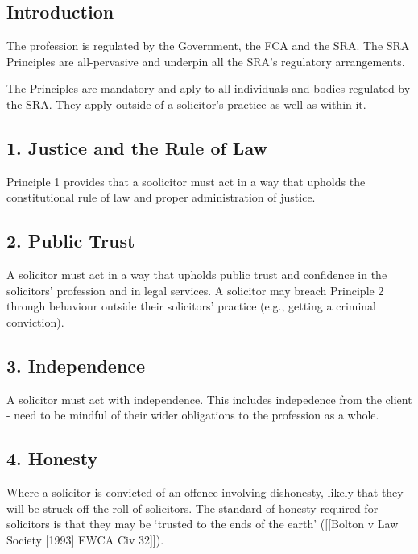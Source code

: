\documentclass[
]{article}
\begin{document}
\hypertarget{introduction}{%
\subsection{Introduction}\label{introduction}}

The profession is regulated by the Government, the FCA and the SRA. The
SRA Principles are all-pervasive and underpin all the SRA's regulatory
arrangements.

The Principles are mandatory and aply to all individuals and bodies
regulated by the SRA. They apply outside of a solicitor's practice as
well as within it.

\hypertarget{justice-and-the-rule-of-law}{%
\subsection{1. Justice and the Rule of
Law}\label{justice-and-the-rule-of-law}}

Principle 1 provides that a soolicitor must act in a way that upholds
the constitutional rule of law and proper administration of justice.

\hypertarget{public-trust}{%
\subsection{2. Public Trust}\label{public-trust}}

A solicitor must act in a way that upholds public trust and confidence
in the solicitors' profession and in legal services. A solicitor may
breach Principle 2 through behaviour outside their solicitors' practice
(e.g., getting a criminal conviction).

\hypertarget{independence}{%
\subsection{3. Independence}\label{independence}}

A solicitor must act with independence. This includes indepedence from
the client - need to be mindful of their wider obligations to the
profession as a whole.

\hypertarget{honesty}{%
\subsection{4. Honesty}\label{honesty}}

Where a solicitor is convicted of an offence involving dishonesty,
likely that they will be struck off the roll of solicitors. The standard
of honesty required for solicitors is that they may be `trusted to the
ends of the earth' ({[}{[}Bolton v Law Society {[}1993{]} EWCA Civ
32{]}{]}).
\end{document}
